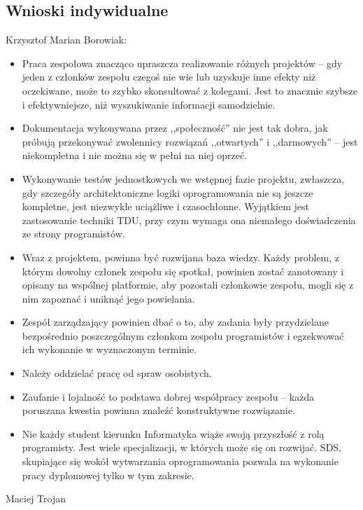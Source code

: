\subsection{Wnioski indywidualne}
\label{Chapter821}

\begin{description}
\item Krzysztof Marian Borowiak:
\begin{itemize}
\item Praca zespołowa znacząco upraszcza realizowanie różnych projektów -- gdy jeden z członków zespołu czegoś nie wie lub uzyskuje inne efekty niż oczekiwane, może to szybko skonsultować z kolegami. Jest to znacznie szybsze i efektywniejsze, niż wyszukiwanie informacji samodzielnie.
\item Dokumentacja wykonywana przez ,,społeczność'' nie jest tak dobra, jak próbują przekonywać zwolennicy rozwiązań ,,otwartych'' i ,,darmowych'' -- jest niekompletna i nie można się w pełni na niej oprzeć.
\item Wykonywanie testów jednostkowych we wstępnej fazie projektu, zwłaszcza, gdy szczegóły architektoniczne logiki oprogramowania nie są jeszcze kompletne, jest niezwykle uciążliwe i czasochłonne. Wyjątkiem jest zastosowanie techniki TDU, przy czym wymaga ona niemałego doświadczenia ze strony programistów.
\item Wraz z projektem, powinna być rozwijana baza wiedzy. Każdy problem, z którym dowolny członek zespołu się spotkał, powinien zostać zanotowany i opisany na wspólnej platformie, aby pozostali członkowie zespołu, mogli się z nim zapoznać i uniknąć jego powielania.
\item Zespół zarządzający powinien dbać o to, aby zadania były przydzielane bezpośrednio poszczególnym członkom zespołu programistów i egzekwować ich wykonanie w wyznaczonym terminie.
\item Należy oddzielać pracę od spraw osobistych.
\item Zaufanie i lojalność to podstawa dobrej współpracy zespołu -- każda poruszana kwestia powinna znaleźć konstruktywne rozwiązanie.
\item Nie każdy student kierunku Informatyka wiąże swoją przyszłość z rolą programisty. Jest wiele specjalizacji, w których może się on rozwijać. SDS, skupiające się wokół wytwarzania oprogramowania pozwala na wykonanie pracy dyplomowej tylko w tym zakresie.
\end{itemize}
\item Maciej Trojan
\begin{itemize}

\end{itemize}
\end{description}
